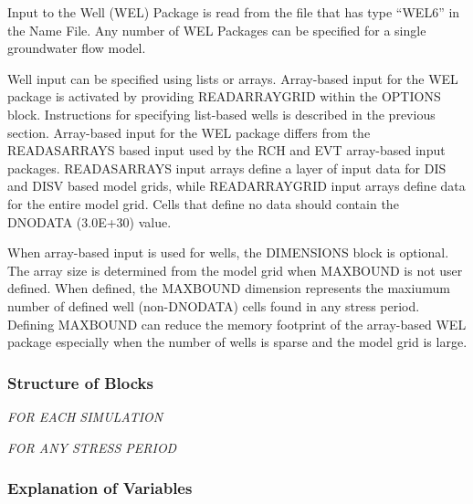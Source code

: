 Input to the Well (WEL) Package is read from the file that has type ``WEL6'' in the Name File.  Any number of WEL Packages can be specified for a single groundwater flow model.

Well input can be specified using lists or arrays.  Array-based input for the WEL package is activated by providing READARRAYGRID within the OPTIONS block.  Instructions for specifying list-based wells is described in the previous section.  Array-based input for the WEL package differs from the READASARRAYS based input used by the RCH and EVT array-based input packages.  READASARRAYS input arrays define a layer of input data for DIS and DISV based model grids, while READARRAYGRID input arrays define data for the entire model grid.  Cells that define no data should contain the DNODATA (3.0E+30) value.

When array-based input is used for wells, the DIMENSIONS block is optional.  The array size is determined from the model grid when MAXBOUND is not user defined.  When defined, the MAXBOUND dimension represents the maxiumum number of defined well (non-DNODATA) cells found in any stress period.  Defining MAXBOUND can reduce the memory footprint of the array-based WEL package especially when the number of wells is sparse and the model grid is large.

\vspace{5mm}
\subsubsection{Structure of Blocks}
\vspace{5mm}

\noindent \textit{FOR EACH SIMULATION}


\vspace{5mm}
\noindent \textit{FOR ANY STRESS PERIOD}

\packageperioddescription

\vspace{5mm}
\subsubsection{Explanation of Variables}
\begin{description}

\end{description}

\vspace{5mm}
